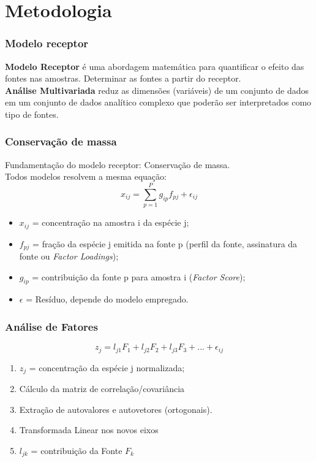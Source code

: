 \section{Metodologia}

\begin{frame}
  \frametitle{Modelo receptor}
  \textbf{Modelo Receptor} é uma abordagem matemática para quantificar o efeito das fontes 
  nas amostras. Determinar as fontes a partir do receptor. \\
  \textbf{Análise Multivariada} reduz as dimensões (variáveis) de um conjunto de dados 
  em um conjunto de dados analítico complexo que poderão ser interpretados como 
  tipo de fontes.
\end{frame}

\begin{frame}
  \frametitle{Conservação de massa}
  Fundamentação do modelo receptor: Conservação de massa. \\
  Todos modelos resolvem a mesma equação: 
  \begin{equation}
    x_{ij} = \sum_{p=1}^{P} g_{ip}f_{pj} + \epsilon_{ij}
  \end{equation} 
 
  \begin{itemize}
    \item $x_{ij}$ = concentração na amostra i da espécie j;
    \item $f_{pj}$ = fração da espécie j emitida na fonte p 
                    (perfil da fonte, assinatura da fonte ou \textit{Factor Loadings}); 
    \item $g_{ip}$ = contribuição da fonte p para amostra i (\textit{Factor Score});
    \item $\epsilon$ = Resíduo, depende do modelo empregado.
  \end{itemize}
\end{frame}

\begin{frame}
  \frametitle{Análise de Fatores}
  \begin{equation}
    z_{j} = l_{j1}F_1 + l_{j2}F_2 + l_{j3}F_3 + ... + \epsilon_{ij}
  \end{equation}
  \begin{enumerate}
    \item $z_{j}$ = concentração da espécie j normalizada;
    \item Cálculo da matriz de correlação/covariância
    \item Extração de autovalores e autovetores (ortogonais). 
    \item Transformada Linear nos novos eixos
    \item $l_{jk}$ = contribuição da Fonte $F_k$
  \end{enumerate}

\end{frame}


